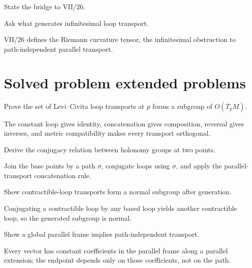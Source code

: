 \begin{exercise}\label{exr:vii25-24}
State the bridge to VII/26.
\end{exercise}
\begin{hint}
Ask what generates infinitesimal loop transport.
\end{hint}
\begin{solution}
VII/26 defines the Riemann curvature tensor, the infinitesimal obstruction to path-independent parallel transport.
\end{solution}

\section{Solved problem extended problems}

\begin{problem}\label{prob:vii25-01}
Prove the set of Levi--Civita loop transports at \(p\) forms a subgroup of \(O(T_pM)\).
\end{problem}
\begin{solution}
The constant loop gives identity, concatenation gives composition, reversal gives inverses, and metric compatibility makes every transport orthogonal.
\end{solution}


\begin{problem}\label{prob:vii25-02}
Derive the conjugacy relation between holonomy groups at two points.
\end{problem}
\begin{solution}
Join the base points by a path \(\sigma\), conjugate loops using \(\sigma\), and apply the parallel-transport concatenation rule.
\end{solution}


\begin{problem}\label{prob:vii25-03}
Show contractible-loop transports form a normal subgroup after generation.
\end{problem}
\begin{solution}
Conjugating a contractible loop by any based loop yields another contractible loop, so the generated subgroup is normal.
\end{solution}


\begin{problem}\label{prob:vii25-04}
Show a global parallel frame implies path-independent transport.
\end{problem}
\begin{solution}
Every vector has constant coefficients in the parallel frame along a parallel extension; the endpoint depends only on those coefficients, not on the path.
\end{solution}


